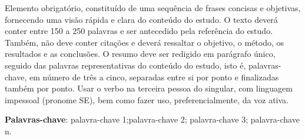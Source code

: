 \setlength{\absparsep}{18pt} %
\begin{resumo}
	
	Elemento obrigatório, constituído de uma sequência de frases concisas e objetivas, fornecendo uma visão rápida e clara do conteúdo do estudo. O texto deverá conter entre 150 a 250 palavras e ser antecedido pela referência do estudo. Também, não deve conter citações e deverá ressaltar o objetivo, o método, os resultados e as conclusões. O resumo deve ser redigido em parágrafo único, seguido das palavras representativas do conteúdo do estudo, isto é, palavras-chave, em número de três a cinco, separadas entre si por ponto e finalizadas também por ponto. Usar o verbo na terceira pessoa do singular, com linguagem impessoal (pronome SE), bem como fazer uso, preferencialmente, da voz ativa.
	
	\vspace{\onelineskip}
	
	\textbf{Palavras-chave}: palavra-chave 1;palavra-chave 2; palavra-chave 3; palavra-chave n.
	
\end{resumo}